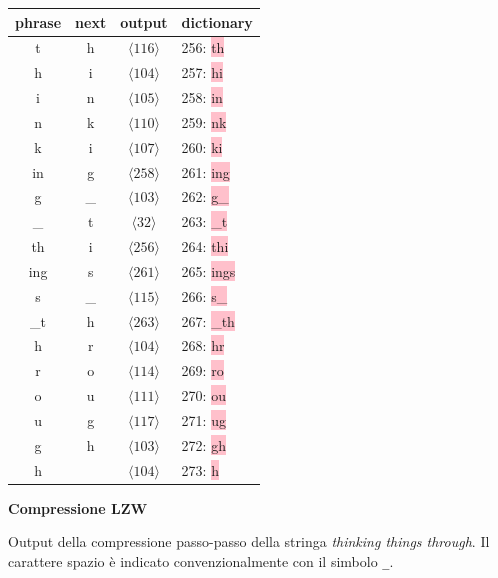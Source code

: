 \begin{table}[htbp]
    \centering
    \begin{minipage}[t]{0.48\textwidth}
        \vspace{0pt} %
        \small %
        \begin{tabular}{c c c l}
            \hline
            \textbf{phrase} & \textbf{next} & \textbf{output} & \textbf{dictionary} \\
            \hline
            t & h & $\langle 116 \rangle$ & 256: \colorbox{pink}{th} \\
            h & i & $\langle 104 \rangle$ & 257: \colorbox{pink}{hi} \\
            i & n & $\langle 105 \rangle$ & 258: \colorbox{pink}{in} \\
            n & k & $\langle 110 \rangle$ & 259: \colorbox{pink}{nk} \\
            k & i & $\langle 107 \rangle$ & 260: \colorbox{pink}{ki} \\
            in & g & $\langle 258 \rangle$ & 261: \colorbox{pink}{ing} \\
            g & \_ & $\langle 103 \rangle$ & 262: \colorbox{pink}{g\_} \\
            \_ & t & $\langle 32 \rangle$ & 263: \colorbox{pink}{\_t} \\
            th & i & $\langle 256 \rangle$ & 264: \colorbox{pink}{thi} \\
            ing & s & $\langle 261 \rangle$ & 265: \colorbox{pink}{ings} \\
            s & \_ & $\langle 115 \rangle$ & 266: \colorbox{pink}{s\_} \\
            \_t & h & $\langle 263 \rangle$ & 267: \colorbox{pink}{\_th} \\
            h & r & $\langle 104 \rangle$ & 268: \colorbox{pink}{hr} \\
            r & o & $\langle 114 \rangle$ & 269: \colorbox{pink}{ro} \\
            o & u & $\langle 111 \rangle$ & 270: \colorbox{pink}{ou} \\
            u & g & $\langle 117 \rangle$ & 271: \colorbox{pink}{ug} \\
            g & h & $\langle 103 \rangle$ & 272: \colorbox{pink}{gh} \\
            h & & $\langle 104 \rangle$ & 273: \colorbox{pink}{h} \\
            \hline
        \end{tabular}
    \end{minipage}
    \hfill %
    \begin{minipage}[t]{0.45\textwidth}
        \vspace{0pt} %
        \textbf{Compressione LZW} 
        \medskip
        
        Output della compressione passo-passo della stringa \textit{thinking things through}. Il carattere spazio è indicato convenzionalmente con il simbolo \texttt{\_}.
    \end{minipage}
\end{table}